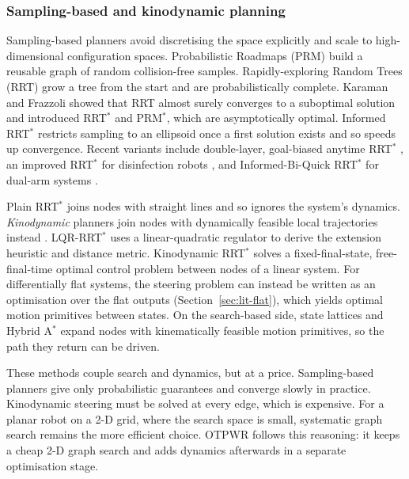 \documentclass[11pt,a4paper]{article}
\begin{document}
\subsubsection{Sampling-based and kinodynamic planning}
\label{sec:lit-sampling}

Sampling-based planners avoid discretising the space explicitly and scale to
high-dimensional configuration spaces. Probabilistic Roadmaps (PRM)
\citep{kavraki1996probabilistic} build a reusable graph of random collision-free
samples. Rapidly-exploring Random Trees (RRT) \citep{lavalle1998rapidly}
grow a tree from the start and are probabilistically complete.
Karaman and Frazzoli \citep{karaman2011sampling} showed that RRT almost
surely converges to a suboptimal solution and introduced RRT$^\ast$ and
PRM$^\ast$, which are asymptotically optimal. Informed RRT$^\ast$
\citep{gammell2014informed} restricts sampling to an ellipsoid once a first
solution exists and so speeds up convergence. Recent variants include
double-layer, goal-biased anytime RRT$^\ast$ \citep{esmaiel2024double}, an
improved RRT$^\ast$ for disinfection robots \citep{wang2024improved}, and
Informed-Bi-Quick RRT$^\ast$ for dual-arm systems \citep{zhang2024informed}.

Plain RRT$^\ast$ joins nodes with straight lines and so ignores the system's
dynamics. \emph{Kinodynamic} planners join nodes with dynamically feasible
local trajectories instead \citep{lavalle2001randomized}. LQR-RRT$^\ast$
\citep{perez2012lqr} uses a linear-quadratic regulator to derive the
extension heuristic and distance metric. Kinodynamic RRT$^\ast$
\citep{webb2013kinodynamic} solves a fixed-final-state, free-final-time
optimal control problem between nodes of a linear system. For differentially
flat systems, the steering problem can instead be written as an optimisation
over the flat outputs (Section~\ref{sec:lit-flat}), which yields optimal
motion primitives between states. On the search-based side, state lattices
\citep{pivtoraiko2009differentially} and Hybrid A$^\ast$
\citep{dolgov2010path} expand nodes with kinematically feasible motion
primitives, so the path they return can be driven.

These methods couple search and dynamics, but at a price. Sampling-based
planners give only probabilistic guarantees and converge slowly in practice.
Kinodynamic steering must be solved at every edge, which is expensive. For a
planar robot on a 2-D grid, where the search space is small, systematic graph
search remains the more efficient choice. OTPWR follows this reasoning: it
keeps a cheap 2-D graph search and adds dynamics afterwards in a separate
optimisation stage.
\end{document}
